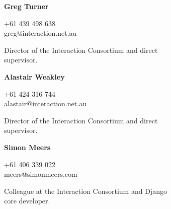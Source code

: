 \documentclass[a4paper,12pt]{article}
\begin{document}
\begin{spacing}{0.95}
\vspace{2mm}
\begin{minipage}[t]{45mm}
	{\small%
		\textbf{\textsf{Greg Turner}}\\
		\vspace{-4mm}\begin{spacing}{0.7}{\footnotesize{\condensed +61 439 498 638\\greg@interaction.net.au}}\\\end{spacing}
		\vspace{-1mm}\begin{spacing}{0.9}{\raggedright Director of the Interaction Consortium and direct\\supervisor.}\end{spacing}%
		\vspace{-5mm}%
	}%
\end{minipage}%
\hspace{5mm}%
\begin{minipage}[t]{45mm}
	{\small%
		\textbf{\textsf{Alastair Weakley}}\\
		\vspace{-4mm}\begin{spacing}{0.7}{\footnotesize{\condensed +61 424 316 744\\alastair@interaction.net.au}}\\\end{spacing}
		\vspace{-1mm}\begin{spacing}{0.9}{\raggedright Director of the Interaction Consortium and direct\\supervisor.}\end{spacing}%
		\vspace{-5mm}%
	}%
\end{minipage}%
\hspace{5mm}%
\begin{minipage}[t]{45mm}
	{\small%
		\textbf{\textsf{Simon Meers}}\\
		\vspace{-4mm}\begin{spacing}{0.7}{\footnotesize{\condensed +61 406 339 022\\meers@simonmeers.com}}\\\end{spacing}
		\vspace{-1mm}\begin{spacing}{0.9}{\raggedright Colleague at the Interaction Consortium and Django\\core developer.}\end{spacing}%
}
\end{minipage}
\end{spacing}
\end{document}
